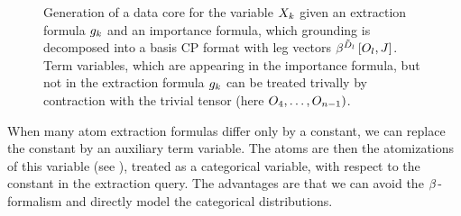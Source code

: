 


\begin{figure}[t]
    \begin{center}
        
    \end{center}
    \caption{Generation of a data core for the variable $X_{k}$ given an extraction formula $g_{k}$ and an importance formula, which grounding is decomposed into a basis CP format with leg vectors $\bencodingofat{\secdatamap_{\indenumerator}}{\indvariableof{\indenumerator},\datvariable}$.
    Term variables, which are appearing in the importance formula, but not in the extraction formula $g_{k}$ can be treated trivally by contraction with the trivial tensor (here $O_{4},\ldots,O_{n-1})$.
    }
    \label{fig:datacoreGeneration}
\end{figure}


When many atom extraction formulas differ only by a constant, we can replace the constant by an auxiliary term variable.
The atoms are then the atomizations of this variable (see ), treated as a categorical variable, with respect to the constant in the extraction query.
The advantages are that we can avoid the $\beta^{}$-formalism and directly model the categorical distributions.

